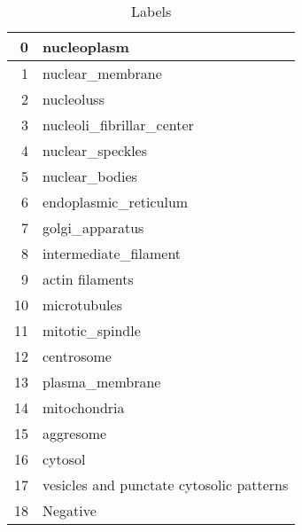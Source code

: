 \documentclass[]{article}
\begin{document}
\begin{table}[H]
\begin{center}
	\caption{Labels}
	\begin{tabular}{|r|l|} \hline
			 0&\gls{nucleoplasm}\\ \hline
			 1&\gls{nuclear_membrane}\\ \hline
			 2&\glspl{nucleolus}\\ \hline
			 3&\gls{nucleoli_fibrillar_center}\\ \hline
			 4&\gls{nuclear_speckles}\\ \hline
			 5&\gls{nuclear_bodies}\\ \hline
			 6&\gls{endoplasmic_reticulum}\\ \hline
			 7&\gls{golgi_apparatus}\\ \hline
			 8&\gls{intermediate_filament}\\ \hline
			 9&\gls{actin} filaments\\\hline
			 10&\gls{microtubules}\\\hline
			 11&\gls{mitotic_spindle}\\\hline
			 12&\gls{centrosome}\\\hline
			 13&\gls{plasma_membrane}\\\hline
			 14&\gls{mitochondria}\\\hline
			 15&\gls{aggresome}\\\hline
			 16&\gls{cytosol}\\\hline
			 17&\gls{vesicles} and \gls{punctate} cytosolic patterns\\\hline
			 18&Negative \\ \hline
	\end{tabular}
\end{center}
\end{table}



\clearpage

\printglossary



\end{document}
